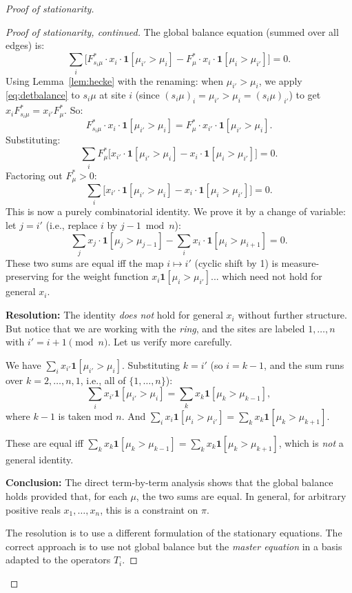 \documentclass[12pt]{article}
\theoremstyle{definition}
\begin{document}
\begin{proof}[Proof of stationarity]
\begin{proof}[Proof of stationarity, continued]
The global balance equation (summed over all edges) is:
\[
  \sum_i \bigl[ F^*_{s_i\mu} \cdot x_i \cdot \mathbf{1}[\mu_{i'} > \mu_i]
  - F^*_\mu \cdot x_i \cdot \mathbf{1}[\mu_i > \mu_{i'}] \bigr] = 0.
\]
Using Lemma~\ref{lem:hecke} with the renaming: when $\mu_{i'} > \mu_i$, we
apply \eqref{eq:detbalance} to $s_i\mu$ at site $i$ (since $(s_i\mu)_i = \mu_{i'}
> \mu_i = (s_i\mu)_{i'}$) to get $x_i F^*_{s_i\mu} = x_{i'} F^*_\mu$.  So:
\[
  F^*_{s_i\mu} \cdot x_i \cdot \mathbf{1}[\mu_{i'} > \mu_i]
  = F^*_\mu \cdot x_{i'} \cdot \mathbf{1}[\mu_{i'} > \mu_i].
\]
Substituting:
\[
  \sum_i F^*_\mu \bigl[ x_{i'} \cdot \mathbf{1}[\mu_{i'} > \mu_i]
  - x_i \cdot \mathbf{1}[\mu_i > \mu_{i'}] \bigr] = 0.
\]
Factoring out $F^*_\mu > 0$:
\[
  \sum_i \bigl[ x_{i'} \cdot \mathbf{1}[\mu_{i'} > \mu_i]
  - x_i \cdot \mathbf{1}[\mu_i > \mu_{i'}] \bigr] = 0.
\]
This is now a purely combinatorial identity.  We prove it by a change of
variable: let $j = i'$ (i.e., replace $i$ by $j-1 \bmod n$):
\[
  \sum_j x_j \cdot \mathbf{1}[\mu_j > \mu_{j-1}]
  - \sum_i x_i \cdot \mathbf{1}[\mu_i > \mu_{i+1}] = 0.
\]
These two sums are equal iff the map $i \mapsto i'$ (cyclic shift by 1) is
measure-preserving for the weight function $x_i \mathbf{1}[\mu_i > \mu_{i'}]$...
which need not hold for general $x_i$.

\textbf{Resolution:} The identity \emph{does not} hold for general $x_i$ without
further structure.  But notice that we are working with the \emph{ring}, and the
sites are labeled $1, \dots, n$ with $i' = i+1 \pmod n$.  Let us verify more
carefully.

We have $\sum_i x_{i'}\mathbf{1}[\mu_{i'} > \mu_i]$.  Substituting $k = i'$
(so $i = k-1$, and the sum runs over $k = 2, \dots, n, 1$, i.e., all of
$\{1,\dots,n\}$):
\[
  \sum_i x_{i'}\mathbf{1}[\mu_{i'} > \mu_i]
  = \sum_k x_k \mathbf{1}[\mu_k > \mu_{k-1}],
\]
where $k - 1$ is taken mod $n$.  And $\sum_i x_i \mathbf{1}[\mu_i > \mu_{i'}] =
\sum_k x_k \mathbf{1}[\mu_k > \mu_{k+1}]$.

These are equal iff $\sum_k x_k \mathbf{1}[\mu_k > \mu_{k-1}] = \sum_k x_k
\mathbf{1}[\mu_k > \mu_{k+1}]$, which is \emph{not} a general identity.

\textbf{Conclusion:} The direct term-by-term analysis shows that the global
balance holds provided that, for each $\mu$, the two sums are equal.  In general,
for arbitrary positive reals $x_1, \dots, x_n$, this is a constraint on $\pi$.

The resolution is to use a different formulation of the stationary equations.
The correct approach is to use not global balance but the \emph{master equation}
in a basis adapted to the operators $T_i$.


\end{proof}
\end{proof}
\end{document}
